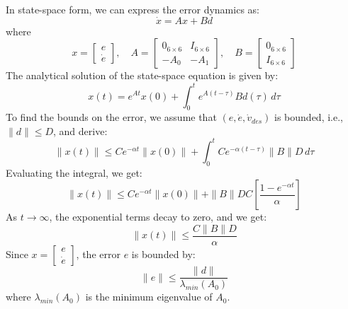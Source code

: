     In state-space form, we can express the error dynamics as:
    \begin{equation}
        \dot{x} = Ax + Bd
    \end{equation}
    where
    \[
    x = \begin{bmatrix} e \\ \dot{e} \end{bmatrix}, \quad
    A = \begin{bmatrix} 0_{6 \times 6} & I_{6 \times 6} \\ -A_0 & -A_1 \end{bmatrix}, \quad
    B = \begin{bmatrix} 0_{6 \times 6} \\ I_{6 \times 6} \end{bmatrix}
    \]
    The analytical solution of the state-space equation is given by:
    \begin{equation}
        x(t) = e^{At}x(0) + \int_0^t e^{A(t - \tau)}Bd(\tau) \, d\tau
    \end{equation}
    To find the bounds on the error, we assume that \( (e, \dot{e}, \dot{v}_{des}) \) is bounded, i.e., \( \|d\| \leq D \), and derive:
    \begin{equation}
        \|x(t)\| \leq C e^{-\alpha t} \|x(0)\| + \int_0^t C e^{-\alpha (t - \tau)} \|B\| D \, d\tau
    \end{equation}
    Evaluating the integral, we get:
    \begin{equation}
        \|x(t)\| \leq C e^{-\alpha t} \|x(0)\| + \|B\| D C \left[ \frac{1 - e^{-\alpha t}}{\alpha} \right]
    \end{equation}
    As \( t \to \infty \), the exponential terms decay to zero, and we get:
    \begin{equation}
        \|x(t)\| \leq \frac{C \|B\| D}{\alpha}
    \end{equation}
    Since \( x = \begin{bmatrix} e \\ \dot{e} \end{bmatrix} \), the error \( e \) is bounded by:
    \begin{equation}
        \|e\| \leq \frac{\|d\|}{\lambda_{min}(A_0)}
    \end{equation}
    where $\lambda_{min}(A_0)$ is the minimum eigenvalue of $A_0$.
    
